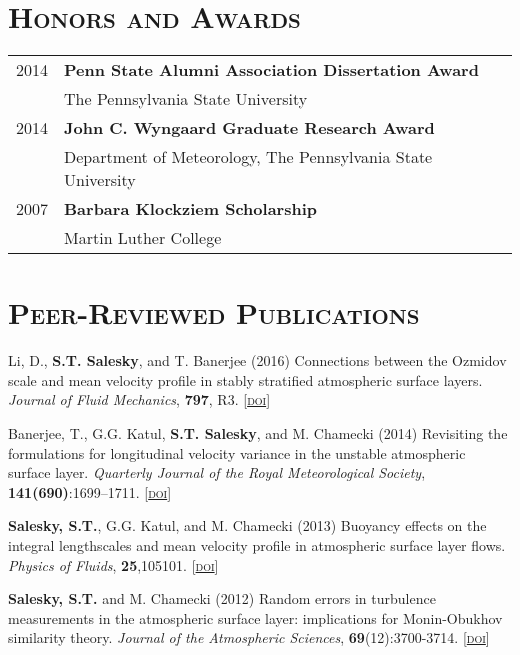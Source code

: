 \documentclass[11pt,letterpaper]{article}
\begin{document}
\section*{\textsc{Honors and Awards}} 
\begin{tabular}{l l}
2014 & \textbf{Penn State Alumni Association Dissertation Award} \\
     & The Pennsylvania State University \\[1.5\parskip]

2014 & \textbf{John C. Wyngaard Graduate Research Award} \\
     & Department of Meteorology, The Pennsylvania State University \\[1.5\parskip]

2007 & \textbf{Barbara Klockziem Scholarship} \\
     & Martin Luther College

\end{tabular}

\section*{\textsc{Peer-Reviewed Publications}} 

Li, D., \textbf{S.T. Salesky}, and T. Banerjee (2016) Connections between
the Ozmidov scale and mean velocity profile in stably stratified atmospheric
surface layers. \textit{Journal of Fluid Mechanics}, \textbf{797}, R3. [\href{http://doi.org/10.1017/jfm.2016.311}{\textsc{doi}}]

Banerjee, T., G.G. Katul, \textbf{S.T. Salesky}, and M. Chamecki (2014) Revisiting the formulations for longitudinal velocity variance in the unstable atmospheric surface layer. \textit{Quarterly Journal of the Royal Meteorological Society}, \textbf{141(690)}:1699--1711. [\href{http://doi.org/10.1002/qj.2472}{\textsc{doi}}] 

\textbf{Salesky, S.T.}, G.G. Katul, and M. Chamecki (2013) Buoyancy effects on the integral lengthscales and mean velocity profile in atmospheric surface layer flows. \textit{Physics of Fluids}, \textbf{25},105101. [\href{http://doi.org/10.1063/1.4823747}{\textsc{doi}}]

\textbf{Salesky, S.T.} and M. Chamecki (2012) Random errors in turbulence measurements in the atmospheric surface layer: implications for Monin-Obukhov similarity theory. \textit{Journal of the Atmospheric Sciences}, \textbf{69}(12):3700-3714. [\href{http://doi.org/10.1175/JAS-D-12-096.1}{\textsc{doi}}]
\end{document}
